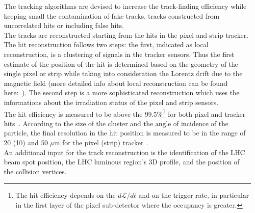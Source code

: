 The tracking algorithms are devised to
increase the track-finding efficiency while keeping small the
contamination of fake tracks, \ie tracks constructed from uncorrelated hits or
including false hits.\\
 The tracks are reconstructed starting from the hits in the pixel and
strip tracker. The hit reconstruction follows two steps: the first,
indicated as local reconstruction, is a clustering of signals in the
tracker sensors. Thus 
the first estimate of the
position of the hit is determined based on the geometry of the single
pixel or strip while taking into consideration the Lorentz drift due
to the magnetic field (more detailed info about local reconstruction
can be found here:~\cite{CMS:particleflow}). The second step is a more
sophisticated reconstruction which uses the informations about the
irradiation status of the pixel and strip sensors. \\
The hit efficiency is measured to be above the 99.5\%\footnote{The hit
  efficiency depends on the
$d\mathcal{L}/dt$ and on the trigger rate, in particular in
the first layer of the pixel sub-detector where the occupancy is greater.} for both pixel
and tracker hits~\cite{CMS:particleflow}. According to the size of the
cluster and the angle of
incidence of the particle, the final resolution in the
hit position is measured to be in the range of 20 (10) and 50 $\mu$m
for the pixel (strip) tracker~\cite{CMS:particleflow}.\\
An additional input for the track reconstruction is the identification
of the LHC beam spot position, \ie the LHC luminous region's
3D profile, and the position of the collision
vertices. \\

